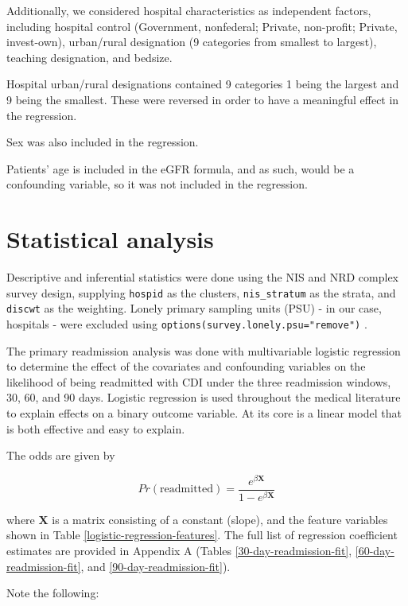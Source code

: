 \documentclass[12pt]{ociamthesis}\usepackage[]{graphicx}\usepackage[]{color}
\begin{document}
Additionally, we considered hospital characteristics as independent factors, including hospital control (Government, nonfederal; Private, non-profit; Private, invest-own), 
urban/rural designation (9 categories from smallest to largest), teaching designation, and bedsize. 

Hospital urban/rural designations contained 9 categories 1 being the largest and 9 being the smallest. These were reversed in order to have a meaningful effect in the regression.

Sex was also included in the regression.

Patients' age is included in the eGFR formula, and as such, would be a confounding variable, so it was not included in the regression.

\section{Statistical analysis}

Descriptive and inferential statistics were done using the NIS and NRD complex survey design, 
supplying \texttt{hospid} as the clusters, \texttt{nis\_stratum} as the strata, and \texttt{discwt} as the weighting. 
Lonely primary sampling units (PSU) - in our case, hospitals - were excluded using \texttt{options(survey.lonely.psu="remove")} \cite{LonelyPSUs}.

The primary readmission analysis was done with multivariable logistic regression to determine the effect of the covariates and confounding variables
on the likelihood of being readmitted with CDI under the three readmission windows, 30, 60, and 90 days. Logistic regression is used throughout
the medical literature to explain effects on a binary outcome variable. At its core is a linear model that is both effective and easy to explain. 

The odds are given by

\begin{equation} \label{logistic}
    Pr(\text{readmitted}) = \frac{e^{\beta \mathbf{X}}}{1 - e^{\beta \mathbf{X}}}
\end{equation}

where $\mathbf{X}$ is a matrix consisting of a constant (slope), and the feature variables shown in Table \ref{logistic-regression-features}.
The full list of regression coefficient estimates are provided in Appendix A
(Tables \ref{30-day-readmission-fit}, \ref{60-day-readmission-fit}, and \ref{90-day-readmission-fit}).


Note the following:
\end{document}
